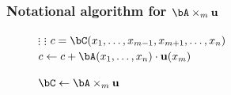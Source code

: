 


\begin{frame}
\frametitle{Notational algorithm for $\bA \times_m \mathbf{u}$}
\begin{figure}
\begin{minipage}{0.9\textwidth} 
\begin{algorithm}[H]
\DontPrintSemicolon
{}
%
\SetAlgoVlined
{}
{
	{
		$\vdots$\;
		{
			{
				$\vdots$\;
				{
					$c = \bC(x_1,\dots,x_{m-1},x_{m+1},\dots,x_{n})$\;
					{
						$c \leftarrow c + \bA(x_1,\dots,x_n) \cdot \mathbf{u}(x_m)$\;
					}
				}
			}
		}
	}
}
\caption{$\bC \leftarrow \bA \times_m \mathbf{u}$\label{alg:ttv}}
\end{algorithm}%
\end{minipage}
\end{figure}
\end{frame}


